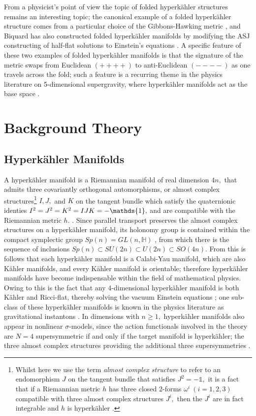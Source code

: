 \documentclass[a4paper,12pt, onecolumn, notitlepage]{article}
\theoremstyle{definition}
\theoremstyle{remark}
\newcommand{\w}{\omega}
\newcommand{\K}{K\"ahler }
\newcommand{\HK}{hyperk\"ahler }
\begin{document}
From a physicist's point of view the topic of folded \HK structures remains an interesting topic; the canonical example of a folded \HK structure comes from a particular choice of the Gibbons-Hawking metric \cite{hitchin_2015}, and Biquard \cite{biquard_2015} has also constructed folded \HK manifolds by modifying the ASJ constructing of half-flat solutions to Einstein's equations \cite{ashtekar_1988}. A specific feature of these two examples of folded \HK manifolds is that the signature of the metric swaps from Euclidean $(++++)$ to anti-Euclidean $(----)$ as one travels across the fold; such a feature is a recurring theme in the physics literature on 5-dimensional supergravity, where \HK manifolds act as the base space \cite{gibbons_2013}.


\section{Background Theory}
\subsection{Hyperk\"ahler Manifolds}

A \HK manifold is a Riemannian manifold of real dimension $4n,$ that admits three covariantly orthogonal automorphisms, or almost complex structures\footnote{Whilst here we use the term \emph{almost complex structure} to refer to an endomorphism $J$ on the tangent bundle that satisfies $J^{2}=-\mathds{1},$ it is a fact that if a Riemannian metric $h$ has three closed 2-forms $\w^{i}\ (i=1,2,3)$ compatible with three almost complex structures $J^{i},$ then the $J^{i}$ are in fact integrable and $h$ is \HK \cite{hitchin_1987}.} $I,J,$ and $K$ on the tangent bundle which satisfy the quaternionic identies $I\indices{^2}=J\indices{^2}=K\indices{^2}=IJK=-\mathds{1},$ and are compatible with the Riemannian metric $h.$ \cite{hitchin_1991}. Since parallel transport preserves the almost complex structures on a \HK manifold, its holonomy group is contained within the compact symplectic group $Sp(n) = GL(n,\mathbb{H})$ \cite{dancer_1994}, from which there is the sequence of inclusions $Sp(n)\subset SU(2n)\subset U(2n) \subset SO(4n).$ From this is follows that each \HK manifold is a Calabi-Yau manifold, which are also \K manifolds, and every \K manifold is orientable; therefore \HK manifolds have become indispensable within the field of mathematical physics. Owing to this is the fact that any 4-dimensional \HK manifold is both \K and Ricci-flat, thereby solving the vacuum Einstein equations \cite{hitchin_1991}; one sub-class of these \HK manifolds is known in the physics literature as gravitational instantons \cite{dancer_1994, eguchi_1978, gibbons_1978}.
In dimensions with $n\geq1,$ \HK manifolds also appear in nonlinear $\sigma$-models, since the action functionals involved in the theory are $N=4$ supersymmetric if and only if the target manifold is hyperk\"ahler; the three almost complex structures providing the additional three supersymmetries \cite{hitchin_1987}.
\end{document}
